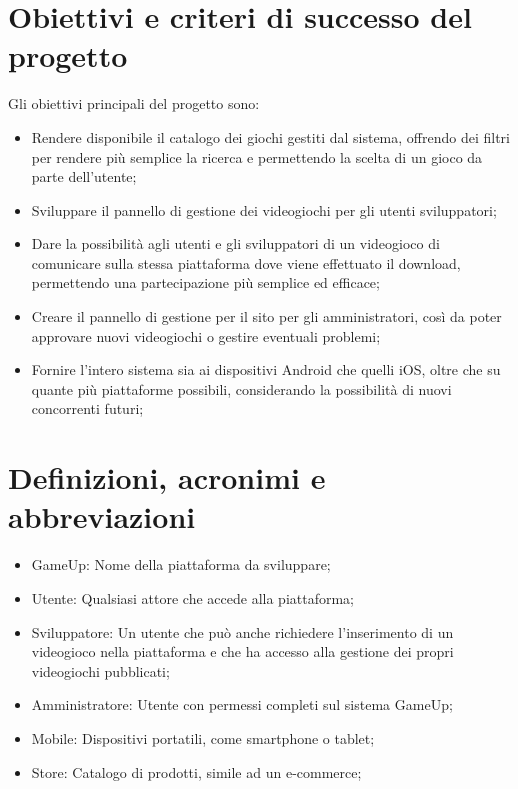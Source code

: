 \section{Obiettivi e criteri di successo del progetto}
Gli obiettivi principali del progetto sono:
\begin{itemize}
\item Rendere disponibile il catalogo dei giochi gestiti dal sistema, offrendo dei filtri per rendere più semplice la ricerca e permettendo la scelta di un gioco da parte dell’utente;
\item Sviluppare il pannello di gestione dei videogiochi per gli utenti sviluppatori;
\item Dare la possibilità agli utenti e gli sviluppatori di un videogioco di comunicare sulla stessa piattaforma dove viene effettuato il download, permettendo una partecipazione più semplice ed efficace;
\item Creare il pannello di gestione per il sito per gli amministratori, così da poter approvare nuovi videogiochi o gestire eventuali problemi;
\item Fornire l’intero sistema sia ai dispositivi Android che quelli iOS, oltre che su quante più piattaforme possibili, considerando la possibilità di nuovi concorrenti futuri;
\end{itemize}

\section{Definizioni, acronimi e abbreviazioni}
\begin{itemize}
\item GameUp: Nome della piattaforma da sviluppare;
\item Utente: Qualsiasi attore che accede alla piattaforma;
\item Sviluppatore: Un utente che può anche richiedere l’inserimento di un videogioco nella piattaforma e che ha accesso alla gestione dei propri videogiochi pubblicati;
\item Amministratore: Utente con permessi completi sul sistema GameUp;
\item Mobile: Dispositivi portatili, come smartphone o tablet;
\item Store: Catalogo di prodotti, simile ad un e-commerce;
\end{itemize}
